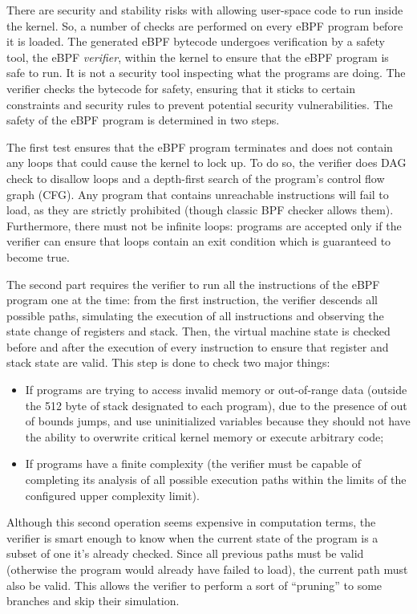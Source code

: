 There are security and stability risks with allowing user-space code to run inside the kernel. 
So, a number of checks are performed on every eBPF program before it is loaded. 
The generated eBPF bytecode undergoes verification by a safety tool, the eBPF \textit{verifier}, within the kernel to ensure that the eBPF program is safe to run.
It is not a security tool inspecting what the programs are doing.
The verifier checks the bytecode for safety, ensuring that it sticks to certain constraints and security rules to prevent potential security vulnerabilities.
The safety of the eBPF program is determined in two steps.

The first test ensures that the eBPF program terminates and does not contain any loops that could cause the kernel to lock up. 
To do so, the verifier does DAG check to disallow loops and a depth-first search of the program's control flow graph (CFG). 
Any program that contains unreachable instructions will fail to load, as they are strictly prohibited (though classic BPF checker allows them).
Furthermore, there must not be infinite loops: programs are accepted only if the verifier can ensure that loops contain an exit condition which is guaranteed to become true.

The second part requires the verifier to run all the instructions of the eBPF program one at the time: from the first instruction, the verifier descends all possible paths, simulating the execution of all instructions and observing the state change of registers and stack.
Then, the virtual machine state is checked before and after the execution of every instruction to ensure that register and stack state are valid. 
This step is done to check two major things: 

\begin{itemize}
	\item If programs are trying to access invalid memory or out-of-range data
		(outside the 512 byte of stack designated to each program), due to	the presence of out of bounds jumps, and use uninitialized variables because they should not have the ability to overwrite critical kernel memory or execute arbitrary code;
	\item If programs have a finite complexity (the verifier must be capable of
		completing its analysis of all possible execution paths within the limits of the configured upper complexity limit).
\end{itemize}

Although this second operation seems expensive in computation terms, the verifier is smart enough to know when the current state of the program is a subset of one it's already checked. 
Since all previous paths must be valid (otherwise the program would already have failed to load), the current path must also be valid. 
This allows the verifier to perform a sort of ``pruning'' to some branches and skip their simulation.

